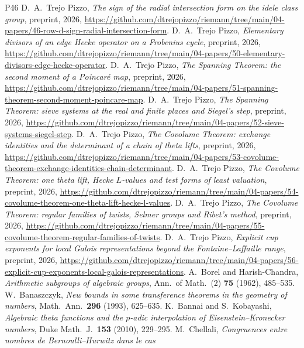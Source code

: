 \documentclass[10pt]{amsart}
\theoremstyle{definition}
\theoremstyle{remark}
\begin{document}
\begin{thebibliography}{P46}
 D.~A.~Trejo Pizzo, \emph{The sign of the radial intersection form on the idele class group}, preprint, 2026, \url{https://github.com/dtrejopizzo/riemann/tree/main/04-papers/46-row-d-sign-radial-intersection-form}.
 D.~A.~Trejo Pizzo, \emph{Elementary divisors of an edge Hecke operator on a Frobenius cycle}, preprint, 2026, \url{https://github.com/dtrejopizzo/riemann/tree/main/04-papers/50-elementary-divisors-edge-hecke-operator}.
 D.~A.~Trejo Pizzo, \emph{The Spanning Theorem: the second moment of a Poincar\'e map}, preprint, 2026, \url{https://github.com/dtrejopizzo/riemann/tree/main/04-papers/51-spanning-theorem-second-moment-poincare-map}.
 D.~A.~Trejo Pizzo, \emph{The Spanning Theorem: sieve systems at the real and finite places and Siegel's step}, preprint, 2026, \url{https://github.com/dtrejopizzo/riemann/tree/main/04-papers/52-sieve-systems-siegel-step}.
 D.~A.~Trejo Pizzo, \emph{The Covolume Theorem: exchange identities and the determinant of a chain of theta lifts}, preprint, 2026, \url{https://github.com/dtrejopizzo/riemann/tree/main/04-papers/53-covolume-theorem-exchange-identities-chain-determinant}.
 D.~A.~Trejo Pizzo, \emph{The Covolume Theorem: one theta lift, Hecke $L$-values and test forms of least valuation}, preprint, 2026, \url{https://github.com/dtrejopizzo/riemann/tree/main/04-papers/54-covolume-theorem-one-theta-lift-hecke-l-values}.
 D.~A.~Trejo Pizzo, \emph{The Covolume Theorem: regular families of twists, Selmer groups and Ribet's method}, preprint, 2026, \url{https://github.com/dtrejopizzo/riemann/tree/main/04-papers/55-covolume-theorem-regular-families-of-twists}.
 D.~A.~Trejo Pizzo, \emph{Explicit cup exponents for local Galois representations beyond the Fontaine--Laffaille range}, preprint, 2026, \url{https://github.com/dtrejopizzo/riemann/tree/main/04-papers/56-explicit-cup-exponents-local-galois-representations}.
 A.~Borel and Harish-Chandra, \emph{Arithmetic subgroups of algebraic groups},
Ann.\ of Math.\ (2) \textbf{75} (1962), 485--535.
 W.~Banaszczyk, \emph{New bounds in some transference theorems in the geometry
of numbers}, Math.\ Ann.\ \textbf{296} (1993), 625--635.
 K.~Bannai and S.~Kobayashi, \emph{Algebraic theta functions and the
$p$-adic interpolation of Eisenstein--Kronecker numbers}, Duke Math.\ J.\ \textbf{153} (2010),
229--295.
 M.~Chellali, \emph{Congruences entre nombres de Bernoulli--Hurwitz dans le cas
}
\end{thebibliography}
\end{document}
